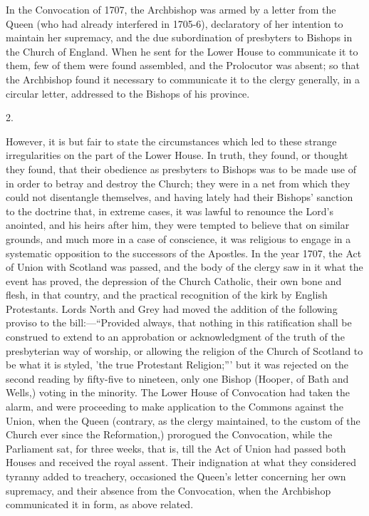 In the Convocation of 1707,
the Archbishop was armed by a letter from the Queen (who had already
interfered in 1705-6), declaratory of her intention to maintain her
supremacy, and the due subordination of presbyters to Bishops in the
Church of England. When he sent for the Lower House to communicate it
to them, few of them were found assembled, and the Prolocutor was
absent; so that the Archbishop found it necessary to communicate it to
the clergy generally, in a circular letter, addressed to the Bishops
of his province.

2.

However, it is but fair to
state the circumstances which led to these strange irregularities on
the part of the Lower House. In truth, they found, or thought
they found, that their obedience as presbyters to Bishops was to be
made use of in order to betray and destroy the Church; they were in a
net from which they could not disentangle themselves, and having
lately had their Bishops' sanction to the doctrine that, in extreme
cases, it was lawful to renounce the Lord's anointed, and his heirs
after him, they were tempted to believe that on similar grounds, and
much more in a case of conscience, it was religious to engage in a
systematic opposition to the successors of the Apostles. In the year
1707, the Act of Union with Scotland was passed, and the body of the
clergy saw in it what the event has proved, the depression of the
Church Catholic, their own bone and flesh, in that country, and the
practical recognition of the kirk by English Protestants. Lords North
and Grey had moved the addition of the following proviso to the
bill:—``Provided always, that nothing in this ratification shall be
construed to extend to an approbation or acknowledgment of the truth
of the presbyterian way of worship, or allowing the religion of the
Church of Scotland to be what it is styled, 'the true Protestant
Religion;''' but it was rejected on the second reading by fifty-five to
nineteen, only one Bishop (Hooper, of Bath and Wells,) voting in the
minority. The Lower House of Convocation had taken the alarm, and were
proceeding to make application to the Commons against the Union, when
the Queen (contrary, as the clergy maintained, to the custom of the
Church ever since the Reformation,) prorogued the Convocation, while
the Parliament sat, for three weeks, that is, till the Act of Union
had passed both Houses and received the royal assent. Their
indignation at what they considered tyranny added to treachery,
occasioned the Queen's letter concerning her own supremacy, and
their absence from the Convocation, when the Archbishop communicated
it in form, as above related.

